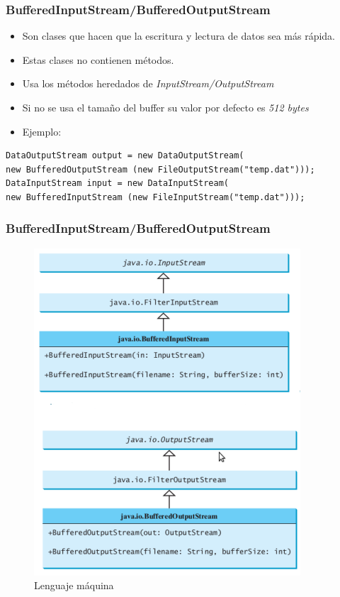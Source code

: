 \documentclass{beamer}
\begin{document}
\begin{frame}[fragile]
\frametitle{BufferedInputStream/BufferedOutputStream}
\begin{itemize}[<+->]
\item Son clases que hacen que la escritura y lectura de datos sea más rápida.
\item Estas clases no contienen métodos.
\item Usa los métodos heredados de \emph{InputStream/OutputStream}
\item Si no se usa el tamaño del buffer su valor por defecto es \emph{512 bytes}
\item Ejemplo:
\end{itemize}
\begin{verbatim}
DataOutputStream output = new DataOutputStream(
new BufferedOutputStream (new FileOutputStream("temp.dat")));
DataInputStream input = new DataInputStream(
new BufferedInputStream (new FileInputStream("temp.dat")));
\end{verbatim}
\end{frame}

\begin{frame}[fragile]
\frametitle{BufferedInputStream/BufferedOutputStream}
\begin{figure}
\includegraphics[scale=0.7]{imagenes/buffer.png} 
\caption{Lenguaje máquina}
\end{figure} 
\end{frame}
\end{document}
